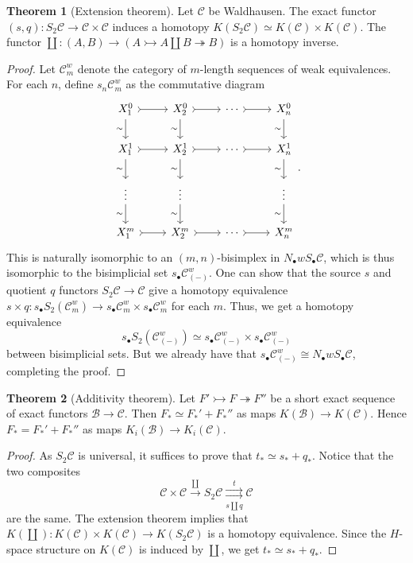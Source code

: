 \documentclass[10pt,letterpaper,cm]{nupset}
\theoremstyle{definition}
\theoremstyle{theorem}
\newtheorem{theorem}{Theorem}
\theoremstyle{remark}
\newcommand{\1}{\mathbf{1}}
\renewcommand{\b}{\mathscr{B}}
\renewcommand{\c}{\mathscr{C}}
\newcommand{\0}{\vec 0}
\begin{document}
\begin{theorem}[Extension theorem]
Let $\c$ be Waldhausen. The exact functor $(s, q) : S_2 \c \to \c \times \c$ induces  a homotopy $K(S_2\c) \simeq K(\c) \times K(\c)$. The functor $\coprod : (A, B) \to (A \rightarrowtail A \coprod B \twoheadrightarrow  B)$ is a homotopy inverse.
\end{theorem}
\begin{proof}
Let $\c^w_m$ denote the category of $m$-length sequences of weak equivalences. For each $n$, define $s_n\c^w_m$ as the commutative diagram
\[
\begin{tikzcd}
 X_1^0 \arrow[d, "\sim"'] \arrow[r, tail] & X_2^0 \arrow[r, tail] \arrow[d, "\sim"'] & \cdots \arrow[r, tail] & X_n^0 \arrow[d, "\sim"'] \\
X_1^1 \arrow[d, "\sim"'] \arrow[r, tail] & X_2^1 \arrow[r, tail] \arrow[d, "\sim"'] & \cdots \arrow[r, tail] & X_n^1 \arrow[d, "\sim"'] \\
  \vdots \arrow[d, "\sim"'] & \vdots \arrow[d, "\sim"'] &  & \vdots \arrow[d, "\sim"'] \\
 X_1^m \arrow[r, tail] & X_2^m \arrow[r, tail] & \cdots \arrow[r, tail] & X_n^m
\end{tikzcd}
.\]
This is naturally isomorphic to an $(m, n)$-bisimplex in $N_{\bullet}w S_{\bullet}\c$, which is thus isomorphic to the bisimplicial set $s_{\bullet}\c^w_{(-)}$. One can show that the source $s$ and quotient $q$ functors  $S_2 \c \to \c$ give a homotopy equivalence $s \times q : s_{\bullet}S_2(\c^w_m) \to s_{\bullet}\c^w_m \times s_{\bullet}\c^w_m$ for each $m$. Thus, we get a homotopy equivalence  $$s_{\bullet}S_2(\c^w_{(-)}) \simeq s_{\bullet}\c^w_{(-)} \times s_{\bullet}\c^w_{(-)}$$ between bisimplicial sets. But we already have that $s_{\bullet}\c^w_{(-)} \cong N_{\bullet}w S_{\bullet}\c$, completing the proof.
\end{proof}

\begin{theorem}[Additivity theorem]
Let $F' \rightarrowtail F \twoheadrightarrow F''$ be a short exact sequence of exact functors $\b \to \c$. Then $F_{\ast} \simeq F_{\ast}' + F_{\ast}''$ as maps $K(\b) \to K(\c)$. Hence $F_{\ast} = F_{\ast}' + F_{\ast}''$ as maps $K_i(\b) \to K_i(\c)$. 
\end{theorem}
\begin{proof}
As $S_2\c$ is universal, it suffices to prove that $t_{\ast}  \simeq s_{\ast} + q_{\ast}$. Notice that the two composites $$\c \times \c \overset{\coprod}{\longrightarrow} S_2 \c  \underset{s \coprod q}{\overset{t}{\rightrightarrows}} \c$$ are the same. The extension theorem implies that $K(\coprod): K(\c) \times K(\c) \to K(S_2 \c)$ is a homotopy equivalence. Since the $H$-space structure on $K(\c)$ is induced by $\coprod$, we get $t_{\ast}  \simeq s_{\ast} + q_{\ast}$. 
\end{proof}
\end{document}

